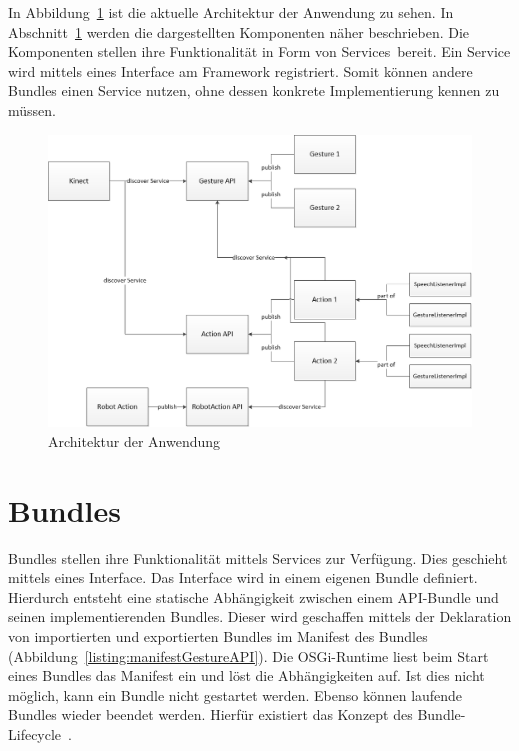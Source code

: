 In Abbildung~\ref{fig:osgiArchitecture} ist die aktuelle Architektur der Anwendung zu sehen. In Abschnitt~\ref{sec:osgiBundles} werden die dargestellten Komponenten n\"aher beschrieben. Die Komponenten stellen ihre Funktionalit\"at in Form von Services~\footnotemark[3] bereit. Ein Service wird mittels eines Interface am Framework registriert. Somit k\"onnen andere Bundles einen Service nutzen, ohne dessen konkrete Implementierung 
kennen zu m\"ussen.


\begin{figure}[htb]
\centering
\includegraphics[width=1\textwidth]{img/09kapitel/osgi-architecture.png}
\caption[Anwendungsarchitektur]{Architektur der Anwendung}
\label{fig:osgiArchitecture}
\end{figure}

\section{Bundles}
\label{sec:osgiBundles}

Bundles stellen ihre Funktionalit\"at mittels Services zur Verf\"ugung. Dies geschieht mittels eines Interface. Das Interface wird in einem eigenen Bundle definiert. Hierdurch entsteht eine statische Abh\"angigkeit zwischen einem API-Bundle und seinen implementierenden Bundles. Dieser wird geschaffen mittels der Deklaration von importierten und exportierten Bundles im Manifest des Bundles (Abbildung~\ref{listing:manifestGestureAPI}). Die OSGi-Runtime liest beim Start eines Bundles das Manifest ein und l\"ost die Abh\"angigkeiten auf. Ist dies nicht m\"oglich, kann ein Bundle nicht gestartet werden. Ebenso k\"onnen laufende Bundles wieder beendet werden. Hierf\"ur existiert das Konzept des Bundle-Lifecycle~\footnotemark[3].


